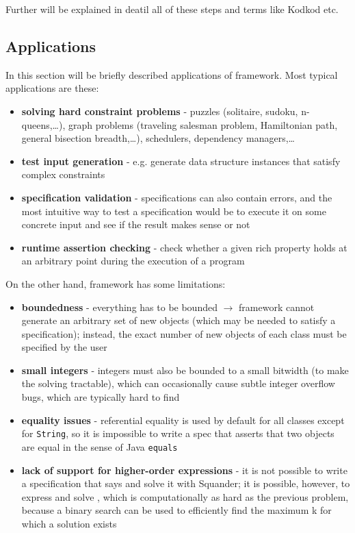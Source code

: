 \documentclass[11pt,twoside,a4paper]{book}
\begin{document}
Further will be explained in deatil all of these steps and terms like Kodkod
etc.

\subsection{Applications}
\label{sub:apps}
In this section will be briefly described applications of framework. Most
typical applications are these:
\begin{itemize}
  \item \textbf{solving hard constraint problems} - puzzles (solitaire, sudoku,
  n-queens,\ldots), graph problems (traveling salesman problem, Hamiltonian
  path, general bisection breadth,\ldots), schedulers, dependency managers,\ldots
  \item \textbf{test input generation} - e.g. generate data structure instances
  that satisfy complex constraints
  \item \textbf{specification validation} - specifications can also contain
  errors, and the most intuitive way to test a specification would be to execute
  it on some concrete input and see if the result makes sense or not
  \item \textbf{runtime assertion checking} - check whether a given rich
  property holds at an arbitrary point during the execution of a program
\end{itemize}

On the other hand, framework has some limitations:
\begin{itemize}
  \item \textbf{boundedness} - everything has to be bounded $\rightarrow$ framework
  cannot generate an arbitrary set of new objects (which may be needed to satisfy a
  specification); instead, the exact number of new objects of each class must be
  specified by the user
  \item \textbf{small integers} - integers must also be bounded to a small
  bitwidth (to make the solving tractable), which can occasionally cause subtle
  integer overflow bugs, which are typically hard to find
  \item \textbf{equality issues} - referential equality is used by default for
  all classes except for \verb|String|, so it is impossible to write a spec that
  asserts that two objects are equal in the sense of Java \verb|equals|
  \item \textbf{lack of support for higher-order expressions} - it is not
  possible to write a specification that says  and solve it with
  Squander; it is possible, however, to express and solve , which is computationally as hard as the previous
  problem, because a binary search can be used to efficiently find the maximum k
  for which a solution exists
 
 
\end{itemize}
\end{document}
